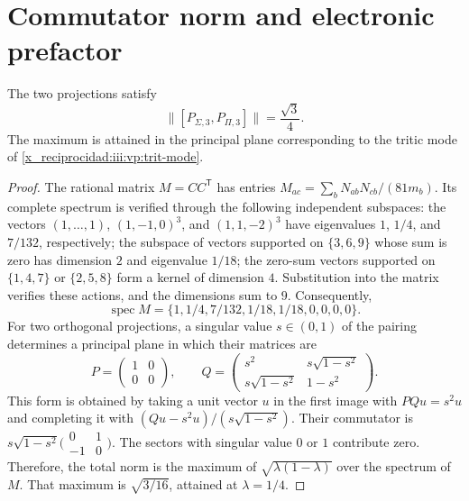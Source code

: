 \section{Commutator norm and electronic prefactor}

\begin{theorem}
The two projections satisfy
\begin{equation}
 \bigl\|[P_{\Sigma,3},P_{\Pi,3}]\bigr\|=\frac{\sqrt3}{4}.
 \label{x_reciprocidad:iii:vp:prefactor}
\end{equation}
The maximum is attained in the principal plane corresponding to the
tritic mode of \eqref{x_reciprocidad:iii:vp:trit-mode}.
\end{theorem}
\begin{proof}
The rational matrix $M=CC^{\mathsf T}$ has entries
$M_{ac}=\sum_bN_{ab}N_{cb}/(81m_b)$. Its complete spectrum is
verified through the following independent subspaces: the
vectors $(1,\ldots,1)$, $(1,-1,0)^3$, and $(1,1,-2)^3$ have
eigenvalues $1$, $1/4$, and $7/132$, respectively; the subspace of
vectors supported on $\{3,6,9\}$ whose sum is zero has dimension
$2$ and eigenvalue $1/18$; the zero-sum vectors supported on
$\{1,4,7\}$ or $\{2,5,8\}$ form a kernel of dimension $4$.
Substitution into the matrix verifies these actions, and the dimensions
sum to $9$. Consequently,
\[
 \operatorname{spec}M=
 \{1,1/4,7/132,1/18,1/18,0,0,0,0\}.
\]
For two orthogonal projections, a singular value $s\in(0,1)$ of the
pairing determines a principal plane in which their matrices are
\[
 P=\begin{pmatrix}1&0\\0&0\end{pmatrix},\qquad
 Q=\begin{pmatrix}s^2&s\sqrt{1-s^2}\\
 s\sqrt{1-s^2}&1-s^2\end{pmatrix}.
\]
This form is obtained by taking a unit vector $u$ in the first
image with $PQu=s^2u$ and completing it with
$(Qu-s^2u)/(s\sqrt{1-s^2})$. Their commutator is
$s\sqrt{1-s^2}\bigl(\begin{smallmatrix}0&1\\-1&0\end{smallmatrix}\bigr)$.
The sectors with singular value $0$ or $1$ contribute zero.
Therefore, the total norm is the maximum of
$\sqrt{\lambda(1-\lambda)}$ over the spectrum of $M$. That maximum
is $\sqrt{3/16}$, attained at $\lambda=1/4$.
\end{proof}

